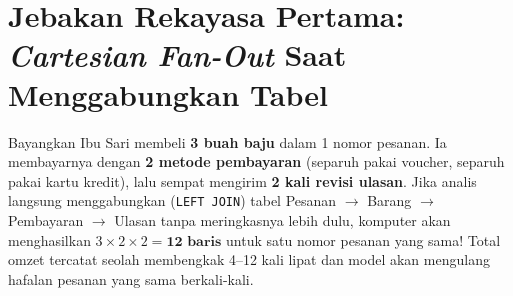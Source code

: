 \documentclass[11pt,a4paper,oneside]{book}
\newcommand{\code}[1]{{\small\nolinkurl{#1}}}
\begin{document}
\section{Jebakan Rekayasa Pertama: \emph{Cartesian Fan-Out} Saat Menggabungkan Tabel}

\begin{bisnisbox}
Bayangkan Ibu Sari membeli \textbf{3 buah baju} dalam 1 nomor pesanan. Ia membayarnya dengan \textbf{2 metode pembayaran} (separuh pakai voucher, separuh pakai kartu kredit), lalu sempat mengirim \textbf{2 kali revisi ulasan}. Jika analis langsung menggabungkan (\code{LEFT JOIN}) tabel Pesanan $\rightarrow$ Barang $\rightarrow$ Pembayaran $\rightarrow$ Ulasan tanpa meringkasnya lebih dulu, komputer akan menghasilkan $3 \times 2 \times 2 = \mathbf{12\text{ baris}}$ untuk satu nomor pesanan yang sama! Total omzet tercatat seolah membengkak 4--12 kali lipat dan model akan mengulang hafalan pesanan yang sama berkali-kali.
\end{bisnisbox}
\end{document}
